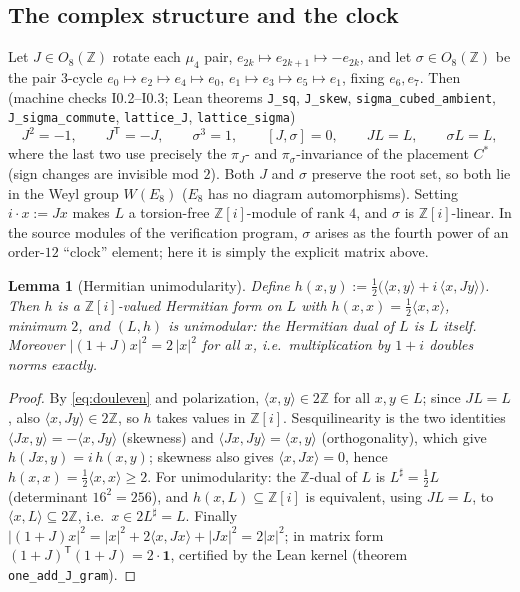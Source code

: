 \documentclass[11pt,a4paper]{article}
\newtheorem{lemma}[theorem]{Lemma}
\theoremstyle{remark}
\newcommand{\Z}{\mathbb Z}
\newcommand{\Cst}{C^{*}}
\newcommand{\ip}[2]{\langle #1,#2\rangle}
\begin{document}
\subsection{The complex structure and the clock}
Let $J\in O_8(\Z)$ rotate each $\mu_4$ pair,
$e_{2k}\mapsto e_{2k+1}\mapsto-e_{2k}$, and let $\sigma\in O_8(\Z)$
be the pair $3$-cycle $e_0\mapsto e_2\mapsto e_4\mapsto e_0$,
$e_1\mapsto e_3\mapsto e_5\mapsto e_1$, fixing $e_6,e_7$.  Then
(machine checks I0.2--I0.3; Lean theorems \texttt{J\_sq},
\texttt{J\_skew}, \texttt{sigma\_cubed\_ambient},
\texttt{J\_sigma\_commute}, \texttt{lattice\_J},
\texttt{lattice\_sigma})
\[
J^2=-1,\qquad J^{\mathsf T}=-J,\qquad \sigma^3=1,\qquad
[J,\sigma]=0,\qquad JL=L,\qquad \sigma L=L ,
\]
where the last two use precisely the $\pi_J$- and
$\pi_\sigma$-invariance of the placement $\Cst$ (sign changes are
invisible mod $2$).  Both $J$ and $\sigma$ preserve the root set, so
both lie in the Weyl group $W(E_8)$ ($E_8$ has no diagram
automorphisms).  Setting $i\cdot x:=Jx$ makes $L$ a torsion-free
$\Z[i]$-module of rank $4$, and $\sigma$ is $\Z[i]$-linear.  In the
source modules of the verification program, $\sigma$ arises as the
fourth power of an order-$12$ ``clock'' element; here it is simply
the explicit matrix above.

\begin{lemma}[Hermitian unimodularity]\label{lem:herm}
Define $h(x,y):=\tfrac12\bigl(\ip xy+i\,\ip x{Jy}\bigr)$.  Then $h$ is
a $\Z[i]$-valued Hermitian form on $L$ with $h(x,x)=\tfrac12\ip xx$,
minimum $2$, and $(L,h)$ is \emph{unimodular}: the Hermitian dual of
$L$ is $L$ itself.  Moreover $|(1+J)x|^2=2\,|x|^2$ for all $x$, i.e.\
multiplication by $1+i$ doubles norms exactly.
\end{lemma}

\begin{proof}
By \eqref{eq:douleven} and polarization, $\ip xy\in2\Z$ for all
$x,y\in L$; since $JL=L$, also $\ip x{Jy}\in2\Z$, so $h$ takes values
in $\Z[i]$.  Sesquilinearity is the two identities
$\ip{Jx}y=-\ip x{Jy}$ (skewness) and $\ip{Jx}{Jy}=\ip xy$
(orthogonality), which give $h(Jx,y)=i\,h(x,y)$; skewness also gives
$\ip x{Jx}=0$, hence $h(x,x)=\tfrac12\ip xx\ge2$.  For unimodularity:
the $\Z$-dual of $L$ is $L^{\sharp}=\tfrac12L$ (determinant
$16^2=256$), and $h(x,L)\subseteq\Z[i]$ is equivalent, using $JL=L$,
to $\ip xL\subseteq2\Z$, i.e.\ $x\in2L^{\sharp}=L$.  Finally
$|(1+J)x|^2=|x|^2+2\ip x{Jx}+|Jx|^2=2|x|^2$; in matrix form
$(1+J)^{\mathsf T}(1+J)=2\cdot\mathbf 1$, certified by the Lean kernel
(theorem \texttt{one\_add\_J\_gram}).
\end{proof}
\end{document}
